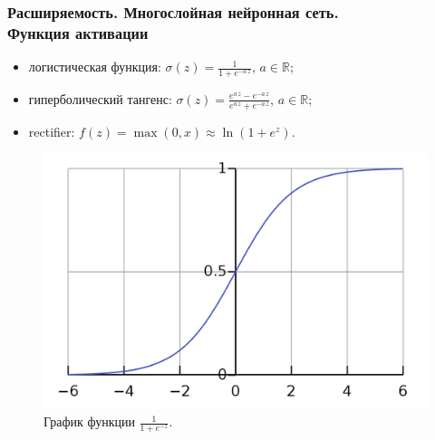 \documentclass[10pt]{beamer}
\begin{document}
\begin{frame}
\frametitle{Расширяемость. Многослойная нейронная сеть. \\Функция активации}
\vspace{0.4cm} 
\begin{itemize}
\item логистическая функция: $\sigma(z) = \frac{1}{1+e^{-a\,z}}$, $a \in \mathbb{R}$;
\item гиперболический тангенс: $\sigma(z) = \frac{e^{a\,z} - e^{-a\,z}}{e^{a\,z} + e^{-a\,z}}$, $a \in \mathbb{R}$;
\item rectifier: $f(z) = \max (0,x)\approx \ln (1 + e^z)$.
\end{itemize}

\begin{figure}
	\begin{center}
	\includegraphics[scale=0.15]{Logistic_curve}
	\end{center}
	\caption{График функции $\frac{1}{1+e^{-z}}$.}
	\label{fig:tau}
\end{figure} 
\end{frame}


\end{document}
